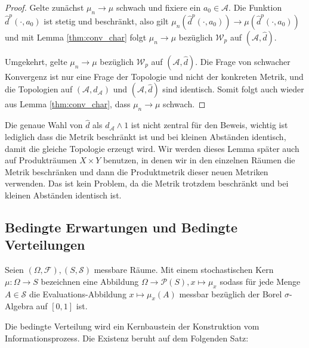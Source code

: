 \begin{proof}
    Gelte zunächst $\mu_n \rightarrow \mu$ schwach und fixiere ein $a_0 \in \mathcal{A}$. Die Funktion $\hat{d}^p(\cdot, a_0)$ ist stetig und beschränkt, also gilt $\mu_n(\hat{d}^p(\cdot, a_0)) \rightarrow \mu(\hat{d}^p(\cdot, a_0))$ und mit Lemma \ref{thm:conv_char} folgt $\mu_n \rightarrow \mu$ bezüglich $\mathcal{W}_p$ auf $(\mathcal{A}, \hat{d})$.

    Umgekehrt, gelte $\mu_n \rightarrow \mu$ bezüglich $\mathcal{W}_p$ auf $(\mathcal{A}, \hat{d})$. Die Frage von schwacher Konvergenz ist nur eine Frage der Topologie und nicht der konkreten Metrik, und die Topologien auf $(\mathcal{A}, d_\mathcal{A})$ und $(\mathcal{A}, \hat{d})$ sind identisch. Somit folgt auch wieder aus Lemma \ref{thm:conv_char}, dass $\mu_n \rightarrow \mu$ schwach.
\end{proof}
\begin{remark}
    Die genaue Wahl von $\hat{d}$ als $d_\mathcal{A} \wedge 1$ ist nicht zentral für den Beweis, wichtig ist lediglich dass die Metrik beschränkt ist und bei kleinen Abständen identisch, damit die gleiche Topologie erzeugt wird. Wir werden dieses Lemma später auch auf Produkträumen $X \times Y$ benutzen, in denen wir in den einzelnen Räumen die Metrik beschränken und dann die Produktmetrik dieser neuen Metriken verwenden. Das ist kein Problem, da die Metrik trotzdem beschränkt und bei kleinen Abständen identisch ist.
\end{remark}
\subsection{Bedingte Erwartungen und Bedingte Verteilungen}
\begin{definition}
Seien $(\Omega, \mathcal{F}), (S, \mathcal{S})$ messbare Räume. Mit einem stochastischen Kern $\mu:\Omega \rightarrow S$ bezeichnen eine Abbildung $\Omega \rightarrow \mathcal{P}(S), x\mapsto \mu_x$ sodass für jede Menge $A \in \mathcal{S}$ die Evaluations-Abbildung $x \mapsto \mu_x(A)$ messbar bezüglich der Borel $\sigma$-Algebra auf $[0,1]$ ist.
\end{definition}
Die bedingte Verteilung wird ein Kernbaustein der Konstruktion vom Informationsprozess. Die Existenz beruht auf dem Folgenden Satz:

